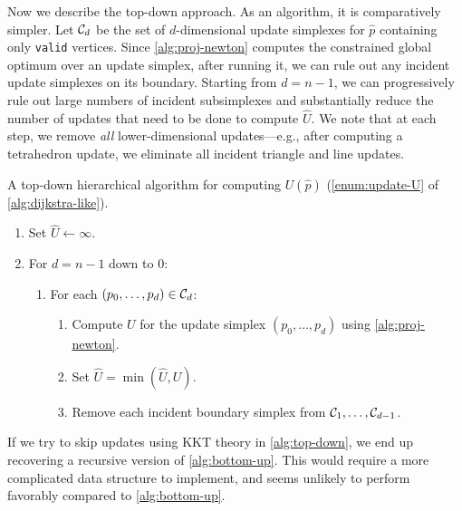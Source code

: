 \documentclass[eikonal.tex]{subfiles}
\begin{document}
Now we describe the top-down approach. As an algorithm, it is
comparatively simpler. Let $\mathcal{C}_d$ be the set of $d$-dimensional
update simplexes for $\hat{p}$ containing only \texttt{valid}
vertices. Since \cref{alg:proj-newton} computes the constrained global
optimum over an update simplex, after running it, we can rule out any
incident update simplexes on its boundary. Starting from $d = n - 1$,
we can progressively rule out large numbers of incident subsimplexes
and substantially reduce the number of updates that need to be done to
compute $\hat{U}$. We note that at each step, we remove \emph{all}
lower-dimensional updates---e.g., after computing a tetrahedron
update, we eliminate all incident triangle and line updates.
\begin{algorithm}[H]
  \caption{A top-down hierarchical algorithm for computing
    $U(\hat{p})$ (\cref{enum:update-U} of
    \cref{alg:dijkstra-like}).}\label{alg:top-down}
  \begin{enumerate}[nolistsep]
  \item Set $\hat{U} \gets \infty$.
  \item For $d = n - 1$ down to $0$:
    \begin{enumerate}
    \item For each $(p_0, \hdots, p_{d}) \in \mathcal{C}_d$:
      \begin{enumerate}
      \item Compute $U$ for the update simplex
        $(p_0, \hdots, p_{d})$ using \cref{alg:proj-newton}.
      \item Set $\hat{U} = \min(\hat{U}, U)$.
      \item Remove each incident boundary simplex from
        $\mathcal{C}_1, \hdots, \mathcal{C}_{d-1}$.
      \end{enumerate}
    \end{enumerate}
  \end{enumerate}
\end{algorithm}
\noindent If we try to skip updates using KKT theory in
\cref{alg:top-down}, we end up recovering a recursive version of
\cref{alg:bottom-up}. This would require a more complicated data
structure to implement, and seems unlikely to perform favorably
compared to \cref{alg:bottom-up}.
\end{document}
